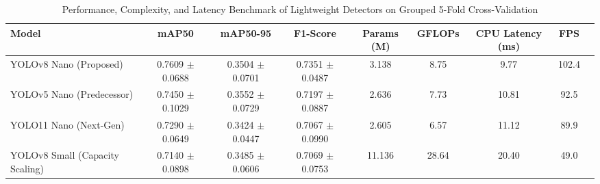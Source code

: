 \begin{table}[htbp]
\caption{Performance, Complexity, and Latency Benchmark of Lightweight Detectors on Grouped 5-Fold Cross-Validation}
\label{tab:model_comparison}
\centering
\begin{tabular}{lcccccccc}
\hline
\textbf{Model} & \textbf{mAP50} & \textbf{mAP50-95} & \textbf{F1-Score} & \textbf{Params (M)} & \textbf{GFLOPs} & \textbf{CPU Latency (ms)} & \textbf{FPS} \\
\hline
YOLOv8 Nano (Proposed) & 0.7609 $\pm$ 0.0688 & 0.3504 $\pm$ 0.0701 & 0.7351 $\pm$ 0.0487 & 3.138 & 8.75 & 9.77 & 102.4 \\
YOLOv5 Nano (Predecessor) & 0.7450 $\pm$ 0.1029 & 0.3552 $\pm$ 0.0729 & 0.7197 $\pm$ 0.0887 & 2.636 & 7.73 & 10.81 & 92.5 \\
YOLO11 Nano (Next-Gen) & 0.7290 $\pm$ 0.0649 & 0.3424 $\pm$ 0.0447 & 0.7067 $\pm$ 0.0990 & 2.605 & 6.57 & 11.12 & 89.9 \\
YOLOv8 Small (Capacity Scaling) & 0.7140 $\pm$ 0.0898 & 0.3485 $\pm$ 0.0606 & 0.7069 $\pm$ 0.0753 & 11.136 & 28.64 & 20.40 & 49.0 \\
\hline
\end{tabular}
\end{table}

